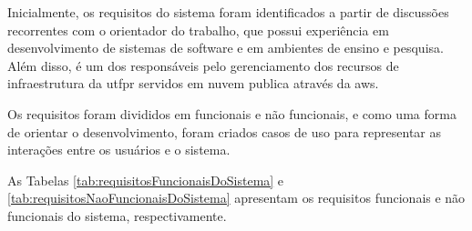 
Inicialmente, os requisitos do sistema foram identificados a partir de discussões recorrentes com o orientador do trabalho, que possui experiência em desenvolvimento de sistemas de software e em ambientes de ensino e pesquisa. Além disso, é um dos responsáveis pelo gerenciamento dos recursos de infraestrutura da \gls{utfpr} servidos em nuvem publica através da \gls{aws}.

Os requisitos foram divididos em funcionais e não funcionais, e como uma forma de orientar o desenvolvimento, foram criados casos de uso para representar as interações entre os usuários e o sistema.

As Tabelas \ref{tab:requisitosFuncionaisDoSistema} e \ref{tab:requisitosNaoFuncionaisDoSistema} apresentam os requisitos funcionais e não funcionais do sistema, respectivamente.

